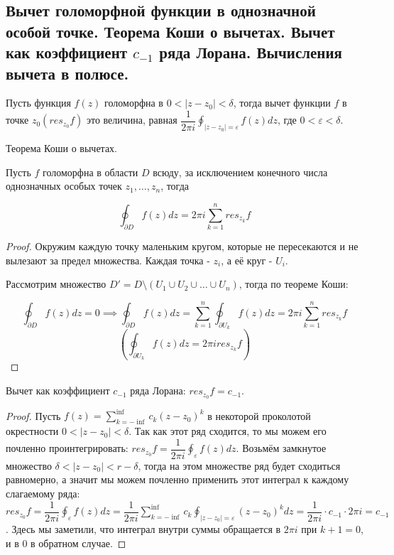 \subsection{Вычет голоморфной функции в однозначной особой точке. Теорема Коши о вычетах. Вычет как коэффициент $c_{-1}$ ряда Лорана. Вычисления вычета в полюсе.}

\begin{definition*}
	Пусть функция $f(z)$ голоморфна в $0 < |z - z_0| < \delta$, тогда вычет функции $f$ в точке $z_0(res_{z_0}f)$ это величина, равная $\dfrac{1}{2\pi i} \oint_{|z - z_0| = \varepsilon} f(z)dz$, где $0 < \varepsilon < \delta$.
\end{definition*}

\begin{theorem*}
	Теорема Коши о вычетах.
	
	Пусть $f$ голоморфна в области $D$ всюду, за исключением конечного числа однозначных особых точек $z_1, \dots, z_n$, тогда
	
	$$\oint_{\partial D} f(z)dz = 2\pi i \sum_{k = 1}^{n} res_{z_k}f$$
\end{theorem*}

\begin{proof}
	Окружим каждую точку маленьким кругом, которые не пересекаются и не вылезают за предел множества. Каждая точка - $z_i$, а её круг - $U_i$.
	
	Рассмотрим множество $D' = D \setminus (U_1 \cup U_2 \cup \dots \cup U_n)$, тогда по теореме Коши: 
	
	$$\oint_{\partial D} f(z)dz = 0 \implies \oint_{\partial D} f(z)dz = \sum_{k=1}^{n} \oint_{\partial U_k} f(z)dz = 2\pi i \sum_{k = 1}^{n} res_{z_k}f$$ $$(\oint_{\partial U_k} f(z)dz = 2\pi i res_{z_k}f )$$
\end{proof}

\begin{theorem*}
	Вычет как коэффициент $c_{-1}$ ряда Лорана: $res_{z_0}f = c_{-1}$.
\end{theorem*}

\begin{proof}
	Пусть $f(z) = \sum_{k = -\inf}^{\inf} c_k(z-z_0)^k$ в некоторой проколотой окрестности $0 < |z - z_0| < \delta$. Так как этот ряд
	сходится, то мы можем его почленно проинтегрировать: $res_{z_0}f = \dfrac{1}{2\pi i} \oint_{\varepsilon} f(z) dz$. Возьмём замкнутое множество $\delta < |z - z_0| < r - \delta$, тогда на этом множестве ряд будет сходиться равномерно, а значит мы можем почленно применить этот интеграл к каждому слагаемому ряда: $res_{z_0}f = \dfrac{1}{2\pi i} \oint_{\varepsilon} f(z)dz = \dfrac{1}{2\pi i} \sum_{k = -\inf}^{\inf} c_k \oint_{|z - z_0| = \varepsilon} (z - z_0)^k dz = \dfrac{1}{2\pi i} \cdot c_{-1} \cdot 2 \pi i = c_{-1}$. Здесь мы заметили, что интеграл внутри суммы обращается в $2\pi i$ при $k+1=0$, и в $0$ в обратном случае.
\end{proof}

